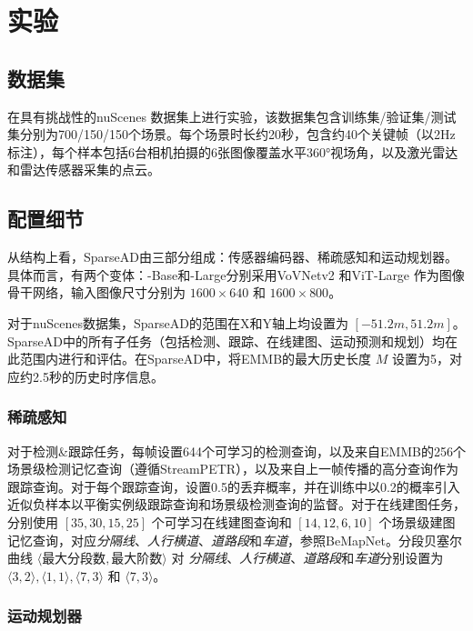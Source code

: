 
\section{实验}
\label{appendix-exps}
\subsection{数据集}
在具有挑战性的nuScenes \cite{caesar2020nuscenes} 数据集上进行实验，该数据集包含训练集/验证集/测试集分别为700/150/150个场景。每个场景时长约20秒，包含约40个关键帧（以2Hz标注），每个样本包括6台相机拍摄的6张图像覆盖水平360°视场角，以及激光雷达和雷达传感器采集的点云。
\subsection{配置细节}

从结构上看，SparseAD由三部分组成：传感器编码器、稀疏感知和运动规划器。具体而言，\model 有两个变体：\model-Base和\model-Large分别采用VoVNetv2\cite{lee2020centermask} 和ViT-Large\cite{dosovitskiy2020image} 作为图像骨干网络，输入图像尺寸分别为 $1600\times640$ 和 $1600\times800$。

对于nuScenes数据集，SparseAD的范围在X和Y轴上均设置为 $\left[-51.2m, 51.2m\right]$。SparseAD中的所有子任务（包括检测、跟踪、在线建图、运动预测和规划）均在此范围内进行和评估。在SparseAD中，将EMMB的最大历史长度 $M$ 设置为5，对应约2.5秒的历史时序信息。

\subsubsection{稀疏感知}

对于检测\&跟踪任务，每帧设置644个可学习的检测查询，以及来自EMMB的256个场景级检测记忆查询（遵循StreamPETR\cite{wang2023exploring}），以及来自上一帧传播的高分查询作为跟踪查询。对于每个跟踪查询，设置0.5的丢弃概率，并在训练中以0.2的概率引入近似负样本以平衡实例级跟踪查询和场景级检测查询的监督。对于在线建图任务，分别使用 $\left[35, 30, 15, 25\right]$ 个可学习在线建图查询和 $\left[14, 12, 6,10\right]$ 个场景级建图记忆查询，对应\textit{分隔线}、\textit{人行横道}、\textit{道路段}和\textit{车道}，参照BeMapNet\cite{qiao2023end}。分段贝塞尔曲线 $\langle \text{最大分段数}, \text{最大阶数}\rangle$ 对
\textit{分隔线}、\textit{人行横道}、\textit{道路段}和\textit{车道}分别设置为
$ \langle3, 2\rangle, \langle1, 1\rangle, \langle7, 3\rangle$ 和 $ \langle7, 3\rangle$。

\subsubsection{运动规划器}

